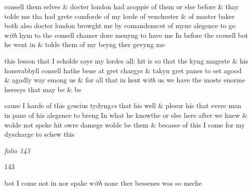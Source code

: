 \documentclass[12pt, a4paper]{book}
\begin{document}
 		
				\marginpar[\vspace{0.5cm}{\textcolor{Gray}{London n}}]{}
			
 		
				\marginpar[\vspace{0.5cm}{\textcolor{Gray}{my L. of wy.}}]{}
			
 		
				\marginpar[\vspace{0.5cm}{\textcolor{Gray}{Mr. Baker}}]{}
			
 		
		\ifthenelse{\isodd{\thepage}}
		{\reversemarginpar}
		{\normalmarginpar}
		consell them selves \& docter london had acoppie of them or else before \&
 			thay tolde me tha had grete comforde of my lorde of venchester \& of master baker both
		  also docter london browght me by comandeme\textit{n}t of myne alegence
		 to go w\textit{ith} hym to the consell chamer dore menyng to have me In before
		 the co\textit{n}sell bot he went in \& tolde them of my beyng ther gevyng me
		
 		
 			
				\marginpar[\vspace{0.5cm}{\textcolor{Gray}{n}}]{}
			
 			
		\ifthenelse{\isodd{\thepage}}
		{\reversemarginpar}
		{\normalmarginpar}
		this lesson that I scholde saye my lordes all: hit is so that the kyng
		  mageste \& his honerabbyll consell hathe bene at gret chargys \& takyn
		 gret panes to set agood \& agodly way emong us \& for all that in
		 kent w\textit{ith} us we have the moste enorme heresys that may be \& be
 		
 			
 				
				\marginpar[\vspace{0.5cm}{\textcolor{Gray}{n}}]{}
			
 				
		\ifthenelse{\isodd{\thepage}}
		{\reversemarginpar}
		{\normalmarginpar}
		
		  cause I harde of this g\textit{ra}cius tydyng\textit{es} that his well \& plesur his that evere
		 man in pane of his alegence to breng In what he knowthe or else
		 here after we knew \& wolde not speke hit owre damege wolde be them
		 \& becasse of this I come for my dyscharge to schew this

\dotfill
						\newpage
{}

\textit{folio 143}


\begin{flushright}{\color{Mahogany}143}\end{flushright}

		\ifthenelse{\isodd{\thepage}}
		{\reversemarginpar}
		{\normalmarginpar}
		bot I come not in nor spake w\textit{ith} none ther bessenes was so meche
\end{document}
